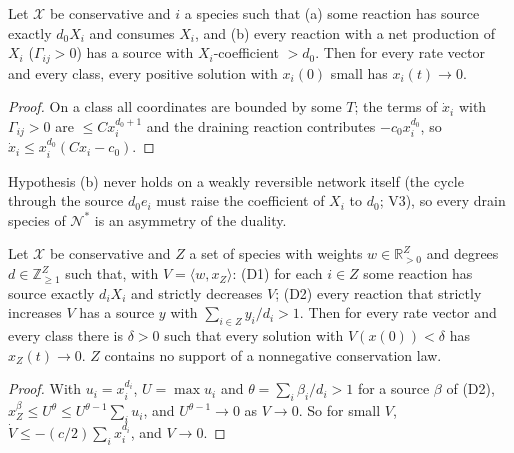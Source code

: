 \documentclass[11pt,a4paper]{report}
\newcommand{\Nd}{\mathcal{N}^{*}}
\newcommand{\Rp}{\mathbb{R}_{>0}}
\begin{document}
\begin{proposition}\label{prop:drain}
Let \(\mathcal X\) be conservative and \(i\) a species such that (a) some reaction has source exactly \(d_0X_i\) and
consumes \(X_i\), and (b) every reaction with a net production of \(X_i\) (\(\Gamma_{ij}>0\)) has a source with
\(X_i\)-coefficient \(>d_0\). Then for every
rate vector and every class, every positive solution with \(x_i(0)\) small has \(x_i(t)\to0\).
\end{proposition}
\begin{proof}
On a class all coordinates are bounded by some \(T\); the terms of \(\dot x_i\) with \(\Gamma_{ij}>0\) are \(\le Cx_i^{d_0+1}\) and the
draining reaction contributes \(-c_0x_i^{d_0}\), so \(\dot x_i\le x_i^{d_0}(Cx_i-c_0)\).
\end{proof}

Hypothesis (b) never holds on a weakly reversible network itself (the cycle through the source \(d_0e_i\) must raise
the coefficient of \(X_i\) to \(d_0\); V3), so every drain species of \(\Nd\) is an asymmetry of the duality.

\begin{theorem}\label{thm:drainsets}
Let \(\mathcal X\) be conservative and \(Z\) a set of species with weights \(w\in\Rp^Z\) and degrees \(d\in\mathbb{Z}^Z_{\ge1}\)
such that, with \(V=\langle w,x_Z\rangle\): (D1) for each \(i\in Z\) some reaction has source exactly \(d_iX_i\) and
strictly decreases \(V\); (D2) every reaction that strictly increases \(V\) has a source \(y\) with
\(\sum_{i\in Z}y_i/d_i>1\). Then for every rate vector and every class there is \(\delta>0\) such that every solution
with \(V(x(0))<\delta\) has \(x_Z(t)\to0\). \(Z\) contains no support of a nonnegative conservation law.
\end{theorem}
\begin{proof}
With \(u_i=x_i^{d_i}\), \(U=\max u_i\) and \(\theta=\sum_i\beta_i/d_i>1\) for a source \(\beta\) of (D2),
\(x_Z^\beta\le U^\theta\le U^{\theta-1}\sum_iu_i\), and \(U^{\theta-1}\to0\) as \(V\to0\). So for small \(V\),
\(\dot V\le-(c/2)\sum_ix_i^{d_i}\), and \(V\to0\).
\end{proof}
\end{document}
